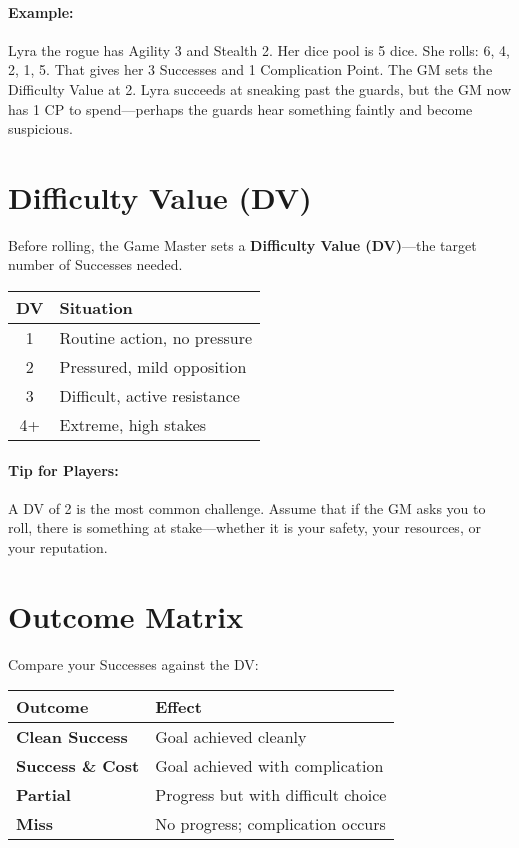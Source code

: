 \begin{multicols}{2}
\paragraph{Example:}  
Lyra the rogue has Agility 3 and Stealth 2. Her dice pool is 5 dice. She rolls: 6, 4, 2, 1, 5. That gives her 3 Successes and 1 Complication Point. The GM sets the Difficulty Value at 2. Lyra succeeds at sneaking past the guards, but the GM now has 1 CP to spend—perhaps the guards hear something faintly and become suspicious.

\section{Difficulty Value (DV)} 

Before rolling, the Game Master sets a \textbf{Difficulty Value (DV)}—the target number of Successes needed.

\begin{center}
\small
\begin{tabular}{cl}
\toprule
\textbf{DV} & \textbf{Situation} \\
\midrule
1 & Routine action, no pressure \\
2 & Pressured, mild opposition \\
3 & Difficult, active resistance \\
4+ & Extreme, high stakes \\
\bottomrule
\end{tabular}
\end{center}

\paragraph{Tip for Players:} A DV of 2 is the most common challenge. Assume that if the GM asks you to roll, there is something at stake—whether it is your safety, your resources, or your reputation.

\section{Outcome Matrix} 

Compare your Successes against the DV:

\begin{center}
\small
\begin{tabular}{ll}
\toprule
\textbf{Outcome} & \textbf{Effect} \\
\midrule
\textbf{Clean Success}\index{Success!Clean} & Goal achieved cleanly \\
\textbf{Success \& Cost}\index{Success!with Cost} & Goal achieved with complication \\
\textbf{Partial}\index{Partial} & Progress but with difficult choice \\
\textbf{Miss}\index{Miss} & No progress; complication occurs \\
\bottomrule
\end{tabular}
\end{center}


\end{multicols}
